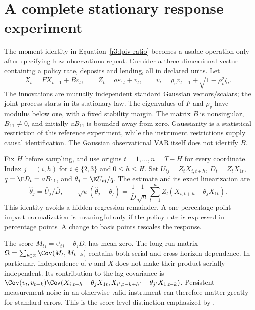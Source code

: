 \section{A complete stationary response experiment}
\label{s4:response-construction}
The moment identity in Equation~\eqref{r3:lpiv-ratio} becomes a usable
operation only after specifying how observations repeat. Consider a
three-dimensional vector containing a policy rate, deposits and lending,
all in declared units. Let
\[
 X_t=FX_{t-1}+B\varepsilon_t,\qquad
 Z_t=a\varepsilon_{1t}+v_t,\qquad
 v_t=\rho_vv_{t-1}+\sqrt{1-\rho_v^2}\zeta_t.
\]
The innovations are mutually independent standard Gaussian vectors/scalars;
the joint process starts in its stationary law. The eigenvalues of $F$ and
$\rho_v$ have modulus below one, with a fixed stability margin. The matrix
$B$ is nonsingular, $B_{11}\ne0$, and initially $aB_{11}$ is bounded away
from zero. Gaussianity is a statistical restriction of this reference
experiment, while the instrument restrictions supply causal identification.
The Gaussian observational VAR itself does not identify $B$.

Fix $H$ before sampling, and use origins $t=1,\ldots,n=T-H$ for every
coordinate. Index $j=(i,h)$ for $i\in\{2,3\}$ and $0\le h\le H$.
Set $U_{tj}=Z_tX_{i,t+h}$, $D_t=Z_tX_{1t}$,
$q=\E D_t=aB_{11}$, and $\theta_j=\E U_{tj}/q$.
The estimate and its exact linearization are
\begin{equation}
 \widehat\theta_j=\bar U_j/\bar D,\qquad
 \sqrt n(\widehat\theta_j-\theta_j)
 =\frac{1}{\bar D}\frac1{\sqrt n}\sum_{t=1}^n
       Z_t(X_{i,t+h}-\theta_jX_{1t}).
 \label{s4:ratio-linearization}
\end{equation}
This identity avoids a hidden regression remainder. A one-percentage-point
impact normalization is meaningful only if the policy rate is expressed
in percentage points. A change to basis points rescales the response.

The score $M_{tj}=U_{tj}-\theta_jD_t$ has mean zero. The long-run matrix
$\Omega=\sum_{k\in\mathbb Z}\Cov(M_t,M_{t-k})$ contains both serial
and cross-horizon dependence. In particular, independence of $v$ and $X$
does not make their product serially independent. Its contribution to
the lag covariance is
$\Cov(v_t,v_{t-k})\Cov(X_{i,t+h}-\theta_jX_{1t},
X_{i',t-k+h'}-\theta_{j'}X_{1,t-k})$.
Persistent measurement noise in an otherwise valid instrument can therefore
matter greatly for standard errors. This is the score-level distinction
emphasized by \citet[Section 2.3]{stock2018}.

